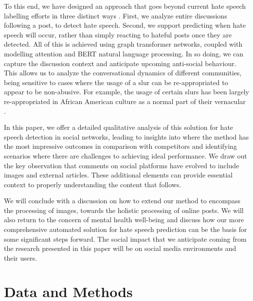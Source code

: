 \documentclass[letterpaper]{article} %
\newcommand{\edit}[1]{{#1}}
\begin{document}
To this end, we have designed an approach that goes beyond current hate speech labelling efforts in three distinct ways \cite{hebert2022predicting}. First, we analyze entire discussions following a post, to detect hate speech. Second, we support predicting when hate speech will occur, rather than simply reacting to hateful posts once they are detected. 
All of this is achieved using graph transformer networks, coupled with modelling attention and BERT natural language processing. In so doing, we can capture the discussion context and anticipate upcoming anti-social behaviour. 
This allows us to analyze the conversational dynamics of different communities, being sensitive to cases where the usage of a slur can be re-appropriated to appear to be non-abusive. For example, the usage of certain slurs has been largely re-appropriated in African American culture as a normal part of their vernacular \cite{thomas2007phonological}. 

In this paper, we offer a detailed qualitative analysis of this solution for hate speech detection in social networks, leading to insights into where the method has the most impressive outcomes in comparison with competitors and identifying scenarios where there are challenges to achieving ideal performance. We draw out the key observation that comments on social platforms have evolved to include images and external articles. These additional elements can provide essential context to properly understanding the content that follows. 

We will conclude with a discussion on how to extend \edit{our method} to encompass the processing of images, towards the holistic processing of online posts. We will also return to the concern of mental health well-being and discuss how our more comprehensive automated solution for hate speech prediction can be the basis for some significant steps forward. The social impact that we anticipate coming from the research presented in this paper will be on social media environments and their users.

\section{Data and Methods}
\end{document}
